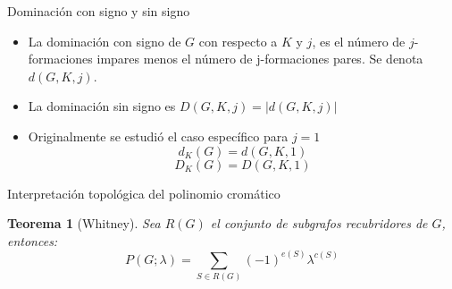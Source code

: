 \documentclass{beamer}
\newtheorem*{thm}{Teorema}
\begin{document}
\begin{frame}{Dominación con signo y sin signo}
    \begin{itemize}
        \item La dominación con signo de $G$ con respecto a $K$ y $j$, es el número de $j$-formaciones impares menos el número de j-formaciones pares. Se denota $d(G, K, j)$.
        \item La dominación sin signo es $D(G, K, j) = |d(G, K, j)|$
        \item Originalmente se estudió el caso específico para $j=1$
        \begin{equation*}
            d_K(G) = d(G, K, 1)
        \end{equation*}
        \begin{equation*}
            D_K(G) = D(G, K, 1)
        \end{equation*}
    \end{itemize}
\end{frame}

\begin{frame}{Interpretación topológica del polinomio cromático}
    \begin{thm}[Whitney]
        Sea $R(G)$ el conjunto de subgrafos recubridores de $G$, entonces:
        \begin{equation*}
            P(G; \lambda) = \sum_{S \in R(G)} (-1)^{e(S)} \lambda^{c(S)}
        \end{equation*}
    \end{thm}
\end{frame}
\end{document}

